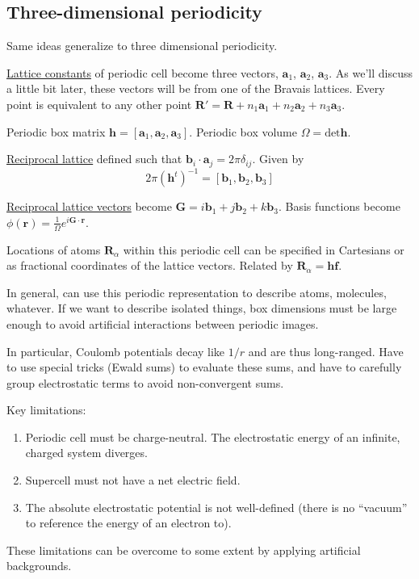 \documentclass[11pt]{article}
\begin{document}
\subsection{Three-dimensional periodicity}
\label{sec:org09b21d5}
Same ideas generalize to three dimensional periodicity.

\uline{Lattice constants} of periodic cell become three vectors, \(\bm{a}_1\), \(\bm{a}_2\), \(\bm{a}_3\).  As we'll discuss a little bit later, these vectors will be from one of the Bravais lattices.  Every point  is equivalent to any other point \(\bm{R}'=\bm{R} + n_1 \bm{a}_1+ n_2 \bm{a}_2+ n_3 \bm{a}_3\).

Periodic box matrix \(\bm{h} = [\bm{a}_1, \bm{a}_2,\bm{a}_3]\).  Periodic box volume \(\Omega = \text{det} \bm{h}\).

\uline{Reciprocal lattice} defined such that \(\bm{b}_i\cdot\bm{a}_j = 2 \pi \delta_{ij}\).  Given by
\[2\pi(\bm{h}^t)^{-1} = [\bm{b}_1,\bm{b}_2,\bm{b}_3]\]

\uline{Reciprocal lattice vectors} become \(\bm{G} = i \bm{b}_1 + j \bm{b}_2 + k \bm{b}_3\).  Basis functions become \(\phi(\bm{r}) = \frac{1}{\Omega}e^{i \bm{G}\cdot\bm{r}}\).

Locations of atoms \(\bm{R}_\alpha\) within this periodic cell can be specified in Cartesians or as fractional coordinates of the lattice vectors.  Related by \(\bm{R}_\alpha = \bm{h}\bm{f}\).

In general, can use this periodic representation to describe atoms, molecules, whatever.  If we want to describe isolated things, box dimensions must be large enough to avoid artificial interactions between periodic images. 

In particular, Coulomb potentials decay like \(1/r\) and are thus long-ranged.  Have to use special tricks (Ewald sums) to evaluate these sums, and have to carefully group electrostatic terms to avoid non-convergent sums.

Key limitations:
\begin{enumerate}
\item Periodic cell must be charge-neutral.  The electrostatic energy of an infinite, charged system diverges.
\item Supercell must not have a net electric field.
\item The absolute electrostatic potential is not well-defined (there is no ``vacuum'' to reference the energy of an electron to).
\end{enumerate}
These limitations can be overcome to some extent by applying artificial backgrounds.
\end{document}
